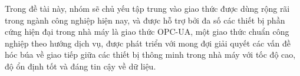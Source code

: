     Trong đề tài này, nhóm sẽ chủ yếu tập trung vào giao thức được dùng rộng rãi trong ngành công nghiệp hiện nay, và được hỗ trợ bởi đa số các thiết bị phần cứng hiện đại trong nhà máy là giao thức OPC-UA, một giao thức chuẩn công nghiệp theo hướng dịch vụ, được phát triển với mong đợi giải quyết các vấn đề hóc búa về giao tiếp giữa các thiết bị thông minh trong nhà máy với tốc độ cao, độ ổn định tốt và đáng tin cậy về dữ liệu.








